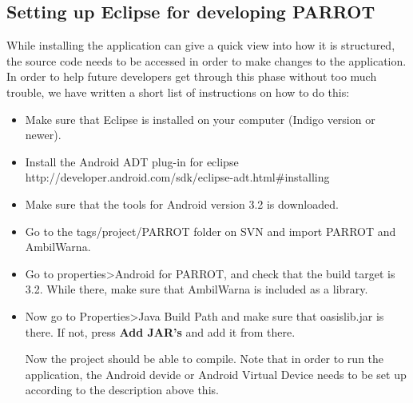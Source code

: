\subsection{Setting up Eclipse for developing PARROT}
While installing the application can give a quick view into how it is structured, the source code needs to be accessed in order to make changes to the application.
In order to help future developers get through this phase without too much trouble, we have written a short list of instructions on how to do this:
\begin{itemize}
	\item Make sure that Eclipse is installed on your computer (Indigo version or newer).
	\item Install the Android ADT plug-in for eclipse http://developer.android.com/sdk/eclipse-adt.html\#installing
	\item Make sure that the tools for Android version 3.2 is downloaded.
	\item Go to the tags/project/PARROT folder on SVN and import PARROT and AmbilWarna.
	\item Go to properties>Android for PARROT, and check that the build target is 3.2.
		\subitem While there, make sure that AmbilWarna is included as a library.
	\item Now go to Properties>Java Build Path and make sure that oasislib.jar is there. If not, press \textbf{Add JAR's} and add it from there.

Now the project should be able to compile. Note that in order to run the application, the Android devide or Android Virtual Device needs to be set up according to the description above this.
	
\end{itemize}
